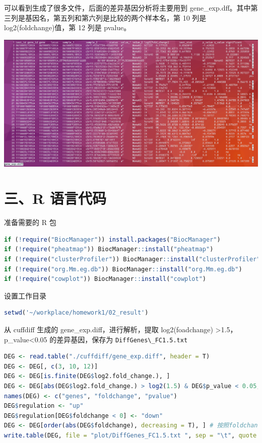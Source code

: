 \documentclass[
  a4paper,
]{article}
\newcommand{\passthrough}[1]{#1}
\begin{document}
\begin{enumerate}
  可以看到生成了很多文件，后面的差异基因分析将主要用到
  gene\_exp.dff。其中第三列是基因名，第五列和第六列是比较的两个样本名，第
  10 列是 log2(foldchange)值，第 12 列是 pvalue。

  \includegraphics{assets/Snipaste_2022-10-26_08-41-47-20221026084153-s33gjur.png}\hspace{0pt}
\end{enumerate}

\hypertarget{ux4e09r-ux8bedux8a00ux4ee3ux7801}{%
\section{三、R 语言代码}\label{ux4e09r-ux8bedux8a00ux4ee3ux7801}}

准备需要的 R 包

\begin{lstlisting}[language=R]
if (!require("BiocManager")) install.packages("BiocManager")
if (!require("pheatmap")) BiocManager::install("pheatmap")
if (!require("clusterProfiler")) BiocManager::install("clusterProfiler")
if (!require("org.Mm.eg.db")) BiocManager::install("org.Mm.eg.db")
if (!require("cowplot")) BiocManager::install("cowplot")
\end{lstlisting}

设置工作目录

\begin{lstlisting}[language=R]
setwd('~/workplace/homework1/02_result')
\end{lstlisting}

从 cuffdiff 生成的 gene\_exp.diff，进行解析，提取 \textbar{}
log2(foadchange) \textbar\textgreater1.5，p\_value\textless0.05
的差异基因，保存为
\passthrough{\lstinline!DiffGenes\_FC1.5.txt!}\hspace{0pt}

\begin{lstlisting}[language=R]
DEG <- read.table("./cuffdiff/gene_exp.diff", header = T)
DEG <- DEG[, c(3, 10, 12)]
DEG <- DEG[is.finite(DEG$log2.fold_change.), ]
DEG <- DEG[abs(DEG$log2.fold_change.) > log2(1.5) & DEG$p_value < 0.05, ] # 提取log2(foadchange)>1.5，p_value<0.05的差异基因
names(DEG) <- c("genes", "foldchange", "pvalue")
DEG$regulation <- "up"
DEG$regulation[DEG$foldchange < 0] <- "down"
DEG <- DEG[order(abs(DEG$foldchange), decreasing = T), ] # 按照foldchange绝对值大小进行倒序排序
write.table(DEG, file = "plot/DiffGenes_FC1.5.txt ", sep = "\t", quote = F, row.names = F)
\end{lstlisting}
\end{document}
